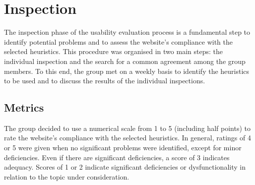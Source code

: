 \section{Inspection}
The inspection phase of the usability evaluation process is a fundamental step to identify potential problems and to assess the website's compliance with the selected heuristics. 
This procedure was organised in two main steps: the individual inspection and the search for a common agreement among the group members.
To this end, the group met on a weekly basis to identify the heuristics to be used and to discuss the results of the individual inspections.

\subsection{Metrics}
The group decided to use a numerical scale from 1 to 5 (including half points) to rate the website's compliance with the selected heuristics.
In general, ratings of 4 or 5 were given when no significant problems were identified, except for minor deficiencies. 
Even if there are significant deficiencies, a score of 3 indicates adequacy. 
Scores of 1 or 2 indicate significant deficiencies or dysfunctionality in relation to the topic under consideration.

